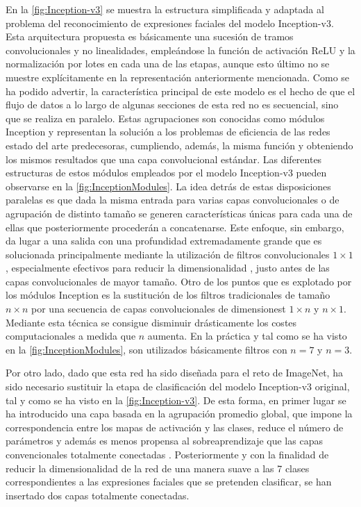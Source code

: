En la \autoref{fig:Inception-v3} se muestra la estructura simplificada y adaptada al problema del reconocimiento de expresiones faciales del modelo Inception-v3. Esta arquitectura propuesta es básicamente una sucesión de tramos convolucionales y no linealidades, empleándose la función de activación ReLU y la normalización por lotes en cada una de las etapas, aunque esto último no se muestre explícitamente en la representación anteriormente mencionada. Como se ha podido advertir, la característica principal de este modelo es el hecho de que el flujo de datos a lo largo de algunas secciones de esta red no es secuencial, sino que se realiza en paralelo. Estas agrupaciones son conocidas como módulos Inception y representan la solución a los problemas de eficiencia de las redes estado del arte predecesoras, cumpliendo, además, la misma función y obteniendo los mismos resultados que una capa convolucional estándar. Las diferentes estructuras de estos módulos empleados por el modelo Inception-v3 pueden observarse en la \autoref{fig:InceptionModules}. La idea detrás de estas disposiciones paralelas es que dada la misma entrada para varias capas convolucionales o de agrupación de distinto tamaño se generen características únicas para cada una de ellas que posteriormente procederán a concatenarse. Este enfoque, sin embargo, da lugar a una salida con una profundidad extremadamente grande que es solucionada principalmente mediante la utilización de filtros convolucionales $1\times 1$, especialmente efectivos para reducir la dimensionalidad \cite{NetworkInNetwork}, justo antes de las capas convolucionales de mayor tamaño. Otro de los puntos que es explotado por los módulos Inception es la sustitución de los filtros tradicionales de tamaño $n\times n$ por una secuencia de capas convolucionales de dimensionest $1\times n$ y $n \times 1$. Mediante esta técnica se consigue disminuir drásticamente los costes computacionales a medida que $n$ aumenta. En la práctica y tal como se ha visto en la \autoref{fig:InceptionModules}, son utilizados básicamente filtros con $n = 7$ y $n = 3$.

Por otro lado, dado que esta red ha sido diseñada para el reto de ImageNet, ha sido necesario sustituir la etapa de clasificación del modelo Inception-v3 original, tal y como se ha visto en la \autoref{fig:Inception-v3}. De esta forma, en primer lugar se ha introducido una capa basada en la agrupación promedio global, que impone la correspondencia entre los mapas de activación y las clases, reduce el número de parámetros y además es menos propensa al sobreaprendizaje que las capas convencionales totalmente conectadas \cite{NetworkInNetwork}. Posteriormente y con la finalidad de reducir la dimensionalidad de la red de una manera suave a las 7 clases correspondientes a las expresiones faciales que se pretenden clasificar, se han insertado dos capas totalmente conectadas.

